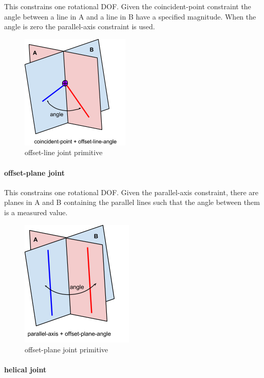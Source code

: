 \documentclass[]{report}
\begin{document}
This constrains one rotational DOF. 
Given the coincident-point constraint the angle between a line in A and 
a line in B have a specified magnitude. 
When the angle is zero the parallel-axis constraint is used.

\begin{figure}[ht!]
	\centering
	\includegraphics[scale=0.7]{images/image01.png}
	\caption{offset-line joint primitive}
	\label{fig:offset-line-primitive}
\end{figure} 
 

\paragraph{offset-plane joint}

This constrains one rotational DOF. 
Given the parallel-axis constraint, there are planes in A and B 
containing the parallel lines such that the angle between them is a measured value. 

\begin{figure}[h!]
	\centering
	\includegraphics[scale=0.7]{images/image09.png}
	\caption{offset-plane joint primitive}
	\label{fig:offset-plane-primitive}
\end{figure}

\paragraph{helical joint}
\end{document}
